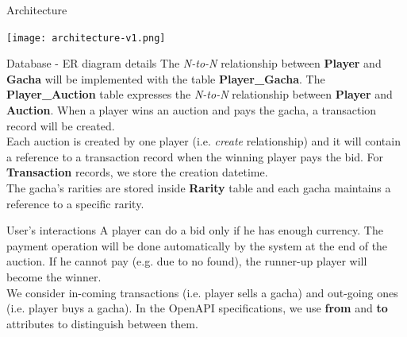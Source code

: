 \documentclass[12pt,aspectratio=169,notheorems]{beamer}
\begin{document}
\begin{frame}{Architecture}
    \begin{center}
        \texttt{[image: architecture-v1.png]}
    \end{center}
\end{frame}

\begin{frame}{Database - ER diagram details}
    The \emph{N-to-N} relationship between \textbf{Player} and \textbf{Gacha} will be implemented with the table \textbf{Player\_Gacha}. The \textbf{Player\_Auction} table expresses the \emph{N-to-N} relationship between \textbf{Player} and \textbf{Auction}. When a player wins an auction and pays the gacha, a transaction record will be created. \\[1ex]
    Each auction is created by one player (i.e. \emph{create} relationship) and it will contain a reference to a transaction record when the winning player pays the bid. For \textbf{Transaction} records, we store the creation datetime. \\[1ex]
    The gacha's rarities are stored inside \textbf{Rarity} table and each gacha maintains a reference to a specific rarity.
\end{frame}

\begin{frame}{User's interactions}
      A player can do a bid only if he has enough currency. The payment operation will be done automatically by the system at the end of the auction. If he cannot pay (e.g. due to no found), the runner-up player will become the winner. \\[1ex]
     We consider in-coming transactions (i.e. player sells a gacha) and out-going ones (i.e. player buys a gacha). In the OpenAPI specifications, we use \textbf{from} and \textbf{to} attributes to distinguish between them.
\end{frame}
\end{document}
